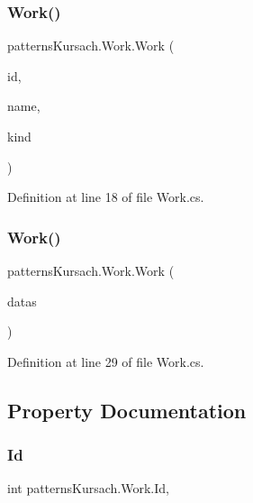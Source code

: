 \subsubsection{\texorpdfstring{Work()}{Work()}\hspace{0.1cm}{\footnotesize\ttfamily [1/2]}}
{\footnotesize\ttfamily patterns\+Kursach.\+Work.\+Work (\begin{DoxyParamCaption}\item[{int}]{id,  }\item[{string}]{name,  }\item[{string}]{kind }\end{DoxyParamCaption})}



Definition at line 18 of file Work.\+cs.

\mbox{\label{classpatterns_kursach_1_1_work_a8a6f1bcd6608b89d8a7e33b170492fc3}} 
\subsubsection{\texorpdfstring{Work()}{Work()}\hspace{0.1cm}{\footnotesize\ttfamily [2/2]}}
{\footnotesize\ttfamily patterns\+Kursach.\+Work.\+Work (\begin{DoxyParamCaption}\item[{Data\+Row}]{datas }\end{DoxyParamCaption})}



Definition at line 29 of file Work.\+cs.



\subsection{Property Documentation}
\mbox{\label{classpatterns_kursach_1_1_work_a2ef9dc5b4453ca418818c10ddc609186}} 
\subsubsection{\texorpdfstring{Id}{Id}}
{\footnotesize\ttfamily int patterns\+Kursach.\+Work.\+Id\hspace{0.3cm}{\ttfamily [get]}, {\ttfamily [set]}}



